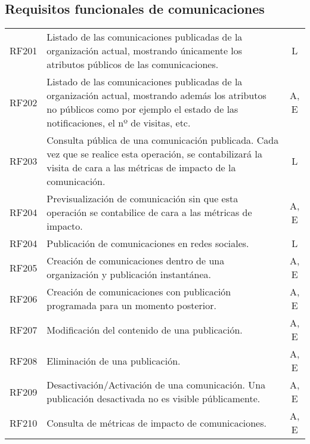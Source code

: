 \subsection{Requisitos funcionales de comunicaciones}
\begin{table}[hbt!]
  \centering
  \setlength\extrarowheight{14pt}
  \begin{tabularx}{\textwidth}{cXc}
    RF201\label{RF201} & Listado de las comunicaciones publicadas de la organización actual, mostrando únicamente los atributos públicos de las comunicaciones. & L \\
    RF202\label{RF202} & Listado de las comunicaciones publicadas de la organización actual, mostrando además los atributos no públicos como por ejemplo el estado de las notificaciones, el nº de visitas, etc. & A, E \\
    RF203\label{RF203} & Consulta pública de una comunicación publicada. Cada vez que se realice esta operación, se contabilizará la visita de cara a las métricas de impacto de la comunicación. & L \\
    RF204\label{RF203} & Previsualización de comunicación sin que esta operación se contabilice de cara a las métricas de impacto. & A, E \\
    RF204\label{RF204} & Publicación de comunicaciones en redes sociales. & L \\
    RF205\label{RF205} & Creación de comunicaciones dentro de una organización y publicación instantánea. & A, E \\
    RF206\label{RF206} & Creación de comunicaciones con publicación programada para un momento posterior. & A, E \\
    RF207\label{RF207} & Modificación del contenido de una publicación. & A, E \\
    RF208\label{RF208} & Eliminación de una publicación. & A, E \\
    RF209\label{RF209} & Desactivación/Activación de una comunicación. Una publicación desactivada no es visible públicamente. & A, E \\
    RF210\label{RF210} & Consulta de métricas de impacto de comunicaciones. & A, E
  \end{tabularx}
  \label{cuadro:requistios-de-comunicaciones }
\end{table}
\FloatBarrier

